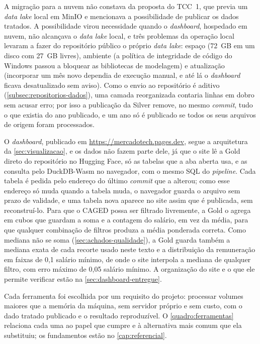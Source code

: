 A migração para a nuvem não constava da proposta do TCC~1, que previa um \textit{data lake} local em MinIO e mencionava a possibilidade de publicar os dados tratados. A possibilidade virou necessidade quando o \textit{dashboard}, hospedado em nuvem, não alcançava o \textit{data lake} local, e três problemas da operação local levaram a fazer do repositório público o próprio \textit{data lake}: espaço (72~GB em um disco com 27~GB livres), ambiente (a política de integridade de código do Windows passou a bloquear as bibliotecas de modelagem) e atualização (incorporar um mês novo dependia de execução manual, e até lá o \textit{dashboard} ficava desatualizado sem aviso). Como o envio ao repositório é aditivo (\autoref{subsec:repositorios-dados}), uma camada reorganizada contaria linhas em dobro sem acusar erro; por isso a publicação da Silver remove, no mesmo \textit{commit}, tudo o que existia do ano publicado, e um ano só é publicado se todos os seus arquivos de origem foram processados.

O \textit{dashboard}, publicado em \url{https://mercadotech.pages.dev}, segue a arquitetura da \autoref{sec:visualizacao}, e os dados não fazem parte dele, já que o site lê a Gold direto do repositório no Hugging Face, só as tabelas que a aba aberta usa, e as consulta pelo DuckDB-Wasm no navegador, com o mesmo SQL do \textit{pipeline}. Cada tabela é pedida pelo endereço do último \textit{commit} que a alterou; como esse endereço só muda quando a tabela muda, o navegador guarda o arquivo sem prazo de validade, e uma tabela nova aparece no site assim que é publicada, sem reconstruí-lo. Para que o CAGED possa ser filtrado livremente, a Gold o agrega em cubos que guardam a soma e a contagem do salário, em vez da média, para que qualquer combinação de filtros produza a média ponderada correta. Como mediana não se soma (\autoref{sec:achados-qualidade}), a Gold guarda também a mediana exata de cada recorte usado neste texto e a distribuição da remuneração em faixas de 0,1 salário mínimo, de onde o site interpola a mediana de qualquer filtro, com erro máximo de 0,05 salário mínimo. A organização do site e o que ele permite verificar estão na \autoref{sec:dashboard-entregue}.

Cada ferramenta foi escolhida por um requisito do projeto: processar volumes maiores que a memória da máquina, sem servidor próprio e sem custo, com o dado tratado publicado e o resultado reproduzível. O \autoref{quadro:ferramentas} relaciona cada uma ao papel que cumpre e à alternativa mais comum que ela substituiu; os fundamentos estão no \autoref{cap:referencial}.

